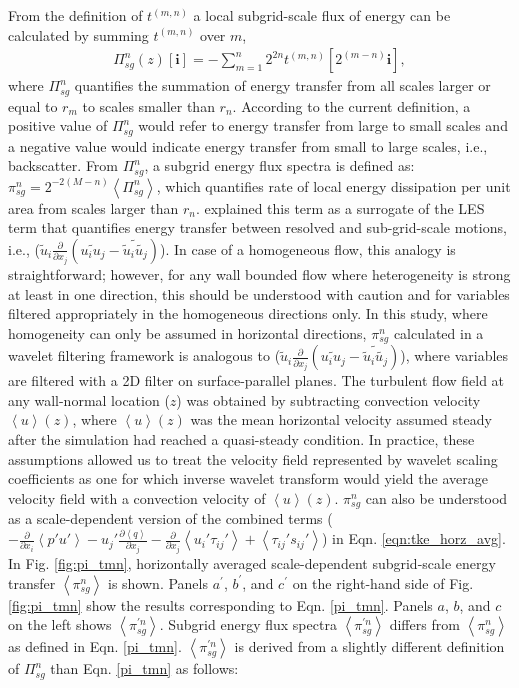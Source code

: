 From the definition of $t^{(m,n)}$ a local subgrid-scale flux of energy can be calculated by summing $t^{(m,n)}$ over $m$, 
\begin{align}
\Pi_{sg}^{n}(z)[\mathbf{i}] = -\sum_{m=1}^{n}2^{2n}t^{(m,n)}[2^{(m-n)}\mathbf{i}],
\label{pi_tmn}
\end{align}
\noindent where $\Pi_{sg}^{n}$ quantifies the summation of energy transfer from all scales larger or equal to $r_m$ to scales smaller than $r_n$. According to the current definition, a positive value of $\Pi_{sg}^{n}$ would refer to energy transfer from large to small scales and a negative value would indicate energy transfer from small to large scales, i.e., backscatter. From $\Pi_{sg}^{n}$, a subgrid energy flux spectra is defined as: $\pi_{sg}^{n}= 2^{-2(M-n)}\left < \Pi_{sg}^{n} \right >$, which quantifies rate of local energy dissipation per unit area from scales larger than $r_n$.  \citet{meneveau_91jfm} explained this term as a surrogate of the LES term that quantifies energy transfer between resolved and sub-grid-scale motions, i.e., ($\tilde{u}_i\frac{\partial }{\partial x_j}(\widetilde{u_iu_j}-\widetilde{\tilde{u}_i\tilde{u_j}})$). In case of a homogeneous flow, this analogy is straightforward; however, for any wall bounded flow where heterogeneity is strong at least in one direction, this should be understood with caution and for variables filtered appropriately in the homogeneous directions only. In this study, where homogeneity can only be assumed in horizontal directions, $\pi^{n}_{sg}$ calculated in a wavelet filtering framework is analogous to ($\tilde{u}_i\frac{\partial }{\partial x_j}(\widetilde{u_iu_j}-\widetilde{\tilde{u}_i\tilde{u_j}})$), where variables are filtered with a 2D filter on surface-parallel planes. The turbulent flow field at any wall-normal location ($z$) was obtained by subtracting convection velocity $\left < u \right >(z)$, where $\left < u \right > (z)$ was the mean horizontal velocity assumed steady after the simulation had reached a quasi-steady condition. In practice, these assumptions allowed us to treat the velocity field represented by wavelet scaling coefficients as one for which inverse wavelet transform  would yield the average velocity field with a convection velocity of $\left < u \right > (z)$. $\pi^{n}_{sg}$  can also be understood as a scale-dependent version of the combined terms ($-\frac{\partial }{\partial x_i}\left < p'u'\right>-u_j'\frac{\partial \left < q\right >}{\partial x_j}-\frac{\partial }{\partial x_j}\left < u_i'\tau_{ij}'\right >+\left < \tau_{ij}'s_{ij}'\right >$) in Eqn. \ref{eqn:tke_horz_avg}. In Fig. \ref{fig:pi_tmn}, horizontally averaged scale-dependent subgrid-scale energy transfer $\left < \pi^{n}_{sg} \right >$ is shown. Panels $a^\prime$, $b^\prime$, and $c^\prime$ on the right-hand side of Fig. \ref{fig:pi_tmn} show the results corresponding to Eqn. \ref{pi_tmn}. Panels $a$, $b$, and $c$ on the left shows $\left < \pi_{sg}^{\prime n} \right >$.  Subgrid energy flux spectra $\left < \pi_{sg}^{\prime n} \right >$ differs from $\left < \pi_{sg}^{n} \right >$ as defined in Eqn. \ref{pi_tmn}. $\left < \pi_{sg}^{\prime n} \right >$ is derived from  a slightly different definition of $\Pi_{sg}^{n}$ than Eqn. \ref{pi_tmn} as follows: 
